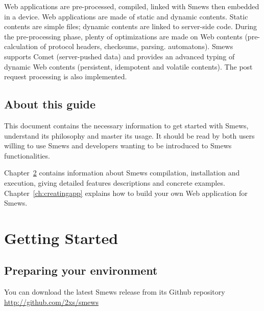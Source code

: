 \documentclass{report}
\newcommand{\rchap}[1]{Chapter~\ref{ch:#1}}
\begin{document}
Web applications are pre-processed, compiled, linked with Smews then embedded in a device. Web applications are made of static and dynamic contents. Static contents are simple files; dynamic contents are linked to server-side code. During the pre-processing phase, plenty of optimizations are made on Web contents (pre-calculation of protocol headers, checksums, parsing. automatons). Smews supports Comet (server-pushed data) and provides an advanced typing of dynamic Web contents (persistent, idempotent and volatile contents). The post request processing is also implemented.

\section{About this guide}

This document contains the necessary information to get started with Smews, understand its philosophy and master its usage. It should be read by both users willing to use Smews and developers wanting to be introduced to Smews functionalities.

\rchap{gettingstarted} contains information about Smews compilation, installation and execution, giving detailed features descriptions and concrete examples. \rchap{creatingapp} explains how to build your own Web application for Smews.

\chapter{Getting Started}
\label{ch:gettingstarted}

\section{Preparing your environment}

You can download the latest Smews release from its Github repository \url{http://github.com/2xs/smews}
\end{document}
